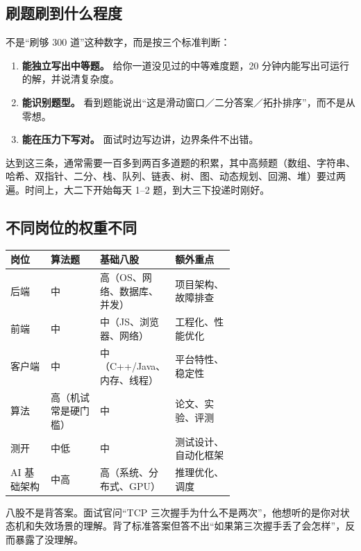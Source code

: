 \documentclass[UTF8,zihao=5,openany]{ctexbook}
\begin{document}
\subsection{刷题刷到什么程度}
不是“刷够 300 道”这种数字，而是按三个标准判断：

\begin{enumerate}
\item \textbf{能独立写出中等题。} 给你一道没见过的中等难度题，20 分钟内能写出可运行的解，并说清复杂度。
\item \textbf{能识别题型。} 看到题能说出“这是滑动窗口／二分答案／拓扑排序”，而不是从零想。
\item \textbf{能在压力下写对。} 面试时边写边讲，边界条件不出错。
\end{enumerate}

达到这三条，通常需要一百多到两百多道题的积累，其中高频题（数组、字符串、哈希、双指针、二分、栈、队列、链表、树、图、动态规划、回溯、堆）要过两遍。时间上，大二下开始每天 1--2 题，到大三下投递时刚好。

\subsection{不同岗位的权重不同}
\begin{center}\small
\begin{tabularx}{\linewidth}{p{0.18\linewidth}p{0.22\linewidth}p{0.24\linewidth}Y}
\toprule
岗位 & 算法题 & 基础八股 & 额外重点 \\
\midrule
后端 & 中 & 高（OS、网络、数据库、并发） & 项目架构、故障排查 \\
前端 & 中 & 中（JS、浏览器、网络） & 工程化、性能优化 \\
客户端 & 中 & 中（C++/Java、内存、线程） & 平台特性、稳定性 \\
算法 & 高（机试常是硬门槛） & 中 & 论文、实验、评测 \\
测开 & 中低 & 中 & 测试设计、自动化框架 \\
AI 基础架构 & 中高 & 高（系统、分布式、GPU） & 推理优化、调度 \\
\bottomrule
\end{tabularx}
\end{center}

八股不是背答案。面试官问“TCP 三次握手为什么不是两次”，他想听的是你对状态机和失效场景的理解。背了标准答案但答不出“如果第三次握手丢了会怎样”，反而暴露了没理解。

\end{document}
